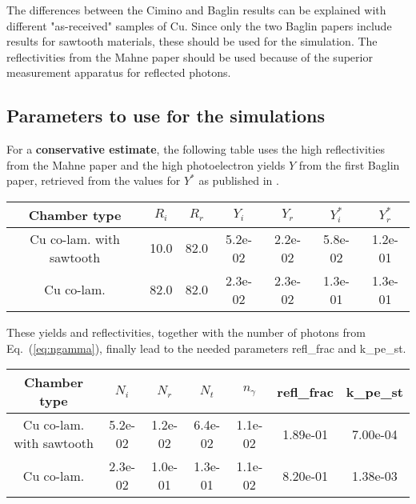 The differences between the Cimino and Baglin results can be explained with different "as-received" samples of Cu.
Since only the two Baglin papers include results for sawtooth materials, these should be used for the simulation.
The reflectivities from the Mahne paper should be used because of the superior measurement apparatus for reflected photons.

\subsection{Parameters to use for the simulations}
\label{sec:parameters}
For a \textbf{conservative estimate}, the following table uses the high reflectivities from the Mahne paper and the high photoelectron yields $Y$ from the first Baglin paper, retrieved from the values for $Y^*$ as published in \cite{baglin}.

\begin{tabular}{c|cccc|cc}
Chamber type & $R_i$ & $R_r$ & $Y_i$ & $Y_r$ & $Y_i^*$ & $Y_r^*$  \\ \hline 
Cu co-lam. with sawtooth &10.0 &82.0 &5.2e-02 &2.2e-02& 5.8e-02 &1.2e-01 \\
Cu co-lam. &82.0 &82.0 &2.3e-02 &2.3e-02& 1.3e-01 &1.3e-01 \\
\end{tabular}

These yields and reflectivities, together with the number of photons from Eq.~(\ref{eq:ngamma}), finally lead to the needed parameters refl\_frac and k\_pe\_st.

\begin{tabular}{c|ccc|c|cc}
Chamber type & $N_i$ & $N_r$ & $N_t$ & $n_\gamma$ & refl\_frac & k\_pe\_st \\ \hline 
Cu co-lam. with sawtooth& 5.2e-02 &1.2e-02 &6.4e-02 &1.1e-02 &1.89e-01 &7.00e-04\\
Cu co-lam.& 2.3e-02 &1.0e-01 &1.3e-01 &1.1e-02 &8.20e-01 &1.38e-03\\
\end{tabular}


